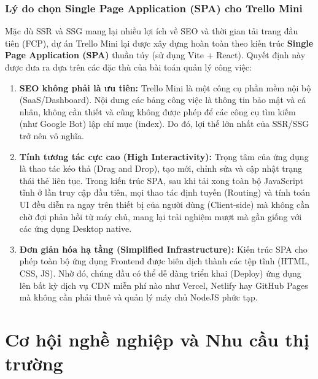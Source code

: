 \subsection{Lý do chọn Single Page Application (SPA) cho Trello Mini}
Mặc dù SSR và SSG mang lại nhiều lợi ích về SEO và thời gian tải trang đầu tiên (FCP), dự án Trello Mini lại được xây dựng hoàn toàn theo kiến trúc \textbf{Single Page Application (SPA)} thuần túy (sử dụng Vite + React). Quyết định này được đưa ra dựa trên các đặc thù của bài toán quản lý công việc:
\begin{enumerate}
    \item \textbf{SEO không phải là ưu tiên:} Trello Mini là một công cụ phần mềm nội bộ (SaaS/Dashboard). Nội dung các bảng công việc là thông tin bảo mật và cá nhân, không cần thiết và cũng không được phép để các công cụ tìm kiếm (như Google Bot) lập chỉ mục (index). Do đó, lợi thế lớn nhất của SSR/SSG trở nên vô nghĩa.
    \item \textbf{Tính tương tác cực cao (High Interactivity):} Trọng tâm của ứng dụng là thao tác kéo thả (Drag and Drop), tạo mới, chỉnh sửa và cập nhật trạng thái thẻ liên tục. Trong kiến trúc SPA, sau khi tải xong toàn bộ JavaScript tĩnh ở lần truy cập đầu tiên, mọi thao tác định tuyến (Routing) và tính toán UI đều diễn ra ngay trên thiết bị của người dùng (Client-side) mà không cần chờ đợi phản hồi từ máy chủ, mang lại trải nghiệm mượt mà gần giống với các ứng dụng Desktop native.
    \item \textbf{Đơn giản hóa hạ tầng (Simplified Infrastructure):} Kiến trúc SPA cho phép toàn bộ ứng dụng Frontend được biên dịch thành các tệp tĩnh (HTML, CSS, JS). Nhờ đó, chúng đầu có thể dễ dàng triển khai (Deploy) ứng dụng lên bất kỳ dịch vụ CDN miễn phí nào như Vercel, Netlify hay GitHub Pages mà không cần phải thuê và quản lý máy chủ NodeJS phức tạp.
\end{enumerate}

\chapter{Cơ hội nghề nghiệp và Nhu cầu thị trường}

